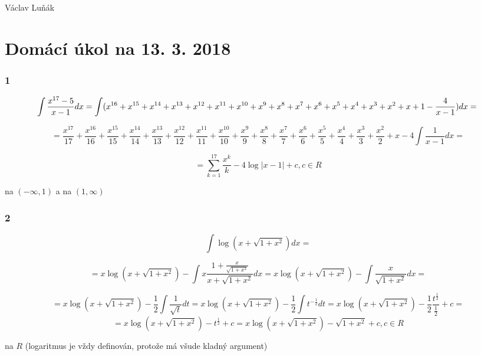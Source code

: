 \documentclass[11pt,a4paper]{article}
\begin{document}
\begin{flushright}
Václav Luňák
\end{flushright}

\part*{Domácí úkol na 13. 3. 2018}

\section*{1}
$$
\int \frac{x^{17}-5}{x-1} dx = 
\int (x^{16}+x^{15}+x^{14}+x^{13}+x^{12}+x^{11}+x^{10}+x^9+x^8+x^7+x^6+x^5+x^4+x^3+x^2+x+1-\frac{4}{x-1}) dx = \\
$$

$$
= \frac{x^{17}}{17} + \frac{x^{16}}{16} + \frac{x^{15}}{15} + \frac{x^{14}}{14} + \frac{x^{13}}{13} + \frac{x^{12}}{12} + \frac{x^{11}}{11} + \frac{x^{10}}{10} + 
\frac{x^9}{9} + \frac{x^8}{8} + \frac{x^7}{7} + \frac{x^6}{6} + \frac{x^5}{5} + \frac{x^4}{4} + \frac{x^3}{3} + \frac{x^2}{2} + x - 4\int \frac{1}{x-1} dx = 
$$

$$
= \sum_{k=1}^{17} \frac{x^k}{k} - 4 \log \vert x-1 \vert + c, c \in R    
$$
\begin{flushright}
na $(-\infty, 1)$ a na $(1, \infty)$
\end{flushright}

\section*{2}
$$
\int \log (x+\sqrt{1+x^2}) dx =  
$$
\begin{flushright}
[per partes: $u = \log (x+\sqrt{1+x^2})$, $v' = 1$]
\end{flushright}
$$
=
x\log (x+\sqrt{1+x^2}) - \int x\frac{1+\frac{x}{\sqrt{1+x^2}}}{x+\sqrt{1+x^2}} dx =
x\log (x+\sqrt{1+x^2}) - \int \frac{x}{\sqrt{1+x^2}} dx = 
$$
\begin{flushright}
[substituce: $t = 1+x^2$, $dt = 2x dx$]
\end{flushright}
$$
=
x\log (x+\sqrt{1+x^2}) -\frac{1}{2}\int \frac{1}{\sqrt{t}} dt =  
x\log (x+\sqrt{1+x^2}) -\frac{1}{2}\int t^{-\frac{1}{2}} dt = x\log (x+\sqrt{1+x^2}) - \frac{1}{2} \frac{t^{\frac{1}{2}}}{\frac{1}{2}} + c = 
$$
$$
= 
x\log (x+\sqrt{1+x^2}) - t^{\frac{1}{2}} + c=
 x\log (x+\sqrt{1+x^2}) - \sqrt{1+x^2} + c, c \in R
$$
\begin{flushright}
na $R$ (logaritmus je vždy definován, protože má všude kladný argument)
\end{flushright}
\end{document}
